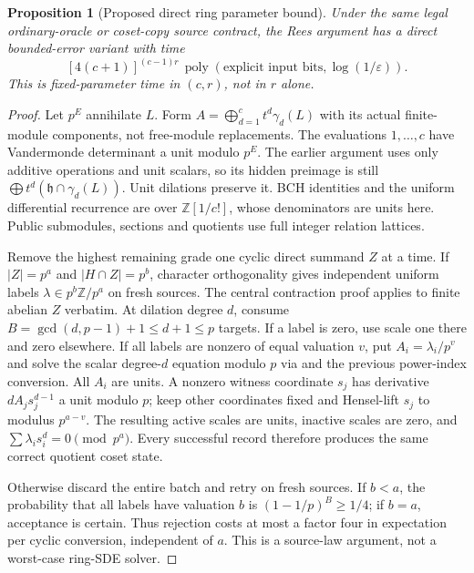 \documentclass[11pt]{article}
\newtheorem{proposition}[theorem]{Proposition}
\theoremstyle{remark}
\newcommand{\eps}{\varepsilon}
\begin{document}
\begin{proposition}[Proposed direct ring parameter bound]
Under the same legal ordinary-oracle or coset-copy source contract, the
Rees argument has a direct bounded-error variant with time
\[
 [4(c+1)]^{(c-1)r}\,
 \operatorname{poly}(\text{explicit input bits},\log(1/\eps)).
\]
This is fixed-parameter time in $(c,r)$, not in $r$ alone.
\end{proposition}
\begin{proof}
Let $p^E$ annihilate $L$. Form
$A=\bigoplus_{d=1}^c t^d\gamma_d(L)$ with its actual finite-module
components, not free-module replacements. The evaluations $1,\ldots,c$
have Vandermonde determinant a unit modulo $p^E$. The earlier argument
uses only additive operations and unit scalars, so its hidden preimage
is still $\bigoplus t^d(\mathfrak h\cap\gamma_d(L))$.
Unit dilations preserve it. BCH identities and the uniform differential
recurrence are over $\mathbb Z[1/c!]$, whose denominators are units here.
Public submodules, sections and quotients use full integer relation lattices.

Remove the highest remaining grade one cyclic direct summand $Z$ at a
time. If $|Z|=p^a$ and $|H\cap Z|=p^b$, character orthogonality gives
independent uniform labels $\lambda\in p^b\mathbb Z/p^a$ on fresh sources.
The central contraction proof applies to finite abelian $Z$ verbatim.
At dilation degree $d$, consume $B=\gcd(d,p-1)+1\le d+1\le p$ targets.
If a label is zero, use scale one there and zero elsewhere. If all labels
are nonzero of equal valuation $v$, put $A_i=\lambda_i/p^v$ and solve the
scalar degree-$d$ equation modulo $p$ via \cite[Fact 2]{is} and the previous
power-index conversion. All $A_i$ are units. A nonzero witness coordinate
$s_j$ has derivative $dA_js_j^{d-1}$ a unit modulo $p$; keep other
coordinates fixed and Hensel-lift $s_j$ to modulus $p^{a-v}$. The resulting
active scales are units, inactive scales are zero, and
$\sum\lambda_i s_i^d=0\pmod {p^a}$. Every successful record therefore
produces the same correct quotient coset state.

Otherwise discard the entire batch and retry on fresh sources. If $b<a$,
the probability that all labels have valuation $b$ is
$(1-1/p)^B\ge1/4$; if $b=a$, acceptance is certain. Thus rejection costs
at most a factor four in expectation per cyclic conversion, independent
of $a$. This is a source-law argument, not a worst-case ring-SDE solver.


\end{proof}
\end{document}
